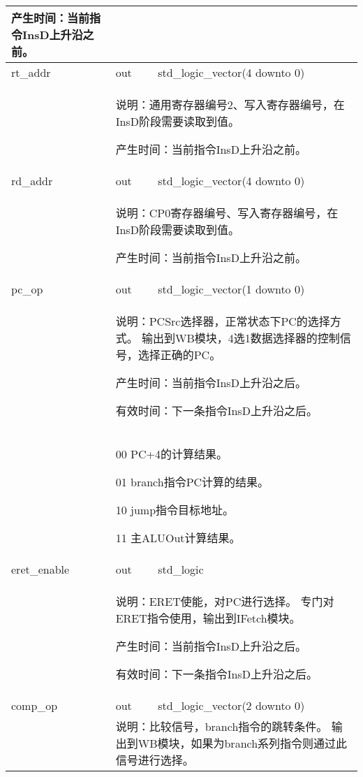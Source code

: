 \begin{tabularx}{\textwidth}{lll}
{                产生时间：当前指令InsD上升沿之前。
            } \\
            \midrule
            rt\_addr        & out       & std\_logic\_vector(4 downto 0) \\
            \cmidrule(l){2-3}
            &
            \multicolumn{2}{X}{
                说明：通用寄存器编号2、写入寄存器编号，在InsD阶段需要读取到值。

                产生时间：当前指令InsD上升沿之前。
            } \\
            \midrule
            rd\_addr        & out       & std\_logic\_vector(4 downto 0) \\
            \cmidrule(l){2-3}
            &
            \multicolumn{2}{X}{
                说明：CP0寄存器编号、写入寄存器编号，在InsD阶段需要读取到值。

                产生时间：当前指令InsD上升沿之前。
            } \\
            \midrule
            pc\_op          & out       & std\_logic\_vector(1 downto 0) \\
            \cmidrule(l){2-3}
            &
            \multicolumn{2}{X}{
                说明：PCSrc选择器，正常状态下PC的选择方式。%
                输出到WB模块，4选1数据选择器的控制信号，选择正确的PC。

                产生时间：当前指令InsD上升沿之后。

                有效时间：下一条指令InsD上升沿之后。 
            } \\
            &
            \multicolumn{2}{X}{
                00 PC+4的计算结果。

                01 branch指令PC计算的结果。

                10 jump指令目标地址。

                11 主ALUOut计算结果。
            } \\
            \midrule
            eret\_enable    & out       & std\_logic \\

            \cmidrule(l){2-3}
            &
            \multicolumn{2}{X}{
                说明：ERET使能，对PC进行选择。%
                专门对ERET指令使用，输出到IFetch模块。

                产生时间：当前指令InsD上升沿之后。

                有效时间：下一条指令InsD上升沿之后。 
            } \\
            \midrule
            comp\_op        & out       & std\_logic\_vector(2 downto 0) \\
            \cmidrule(l){2-3}
            &
            \multicolumn{2}{X}{
                说明：比较信号，branch指令的跳转条件。%
                输出到WB模块，如果为branch系列指令则通过此信号进行选择。

}
\end{tabularx}

